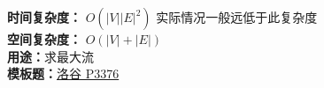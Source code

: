 \textbf{时间复杂度：} $O(|V||E|^2)$ 实际情况一般远低于此复杂度\\
\textbf{空间复杂度：} $O(|V| + |E|)$ \\
\textbf{用途：}求最大流\\
\textbf{模板题：}\href{https://www.luogu.com.cn/problem/P3376}{洛谷 P3376}
